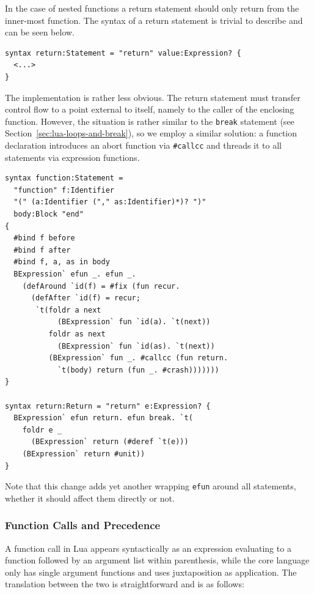 \documentclass{kththesis}
\begin{document}
In the case of nested functions a return statement should only return from the inner-most function. The syntax of a return statement is trivial to describe and can be seen below.

\begin{verbatim}
syntax return:Statement = "return" value:Expression? {
  <...>
}
\end{verbatim}

The implementation is rather less obvious. The return statement must transfer control flow to a point external to itself, namely to the caller of the enclosing function. However, the situation is rather similar to the \texttt{break} statement (see Section~\ref{sec:lua-loops-and-break}), so we employ a similar solution: a function declaration introduces an abort function via \texttt{#callcc} and threads it to all statements via expression functions.

\begin{verbatim}
syntax function:Statement =
  "function" f:Identifier
  "(" (a:Identifier ("," as:Identifier)*)? ")"
  body:Block "end"
{
  #bind f before
  #bind f after
  #bind f, a, as in body
  BExpression` efun _. efun _.
    (defAround `id(f) = #fix (fun recur.
      (defAfter `id(f) = recur;
       `t(foldr a next
            (BExpression` fun `id(a). `t(next))
          foldr as next
            (BExpression` fun `id(as). `t(next))
          (BExpression` fun _. #callcc (fun return.
            `t(body) return (fun _. #crash)))))))
}

syntax return:Return = "return" e:Expression? {
  BExpression` efun return. efun break. `t(
    foldr e _
      (BExpression` return (#deref `t(e)))
    (BExpression` return #unit))
}
\end{verbatim}

Note that this change adds yet another wrapping \texttt{efun} around all statements, whether it should affect them directly or not.

\subsubsection{Function Calls and Precedence} \label{sec:lua-func-call-precedence}

A function call in Lua appears syntactically as an expression evaluating to a function followed by an argument list within parenthesis, while the core language only has single argument functions and uses juxtaposition as application. The translation between the two is straightforward and is as follows:
\end{document}
